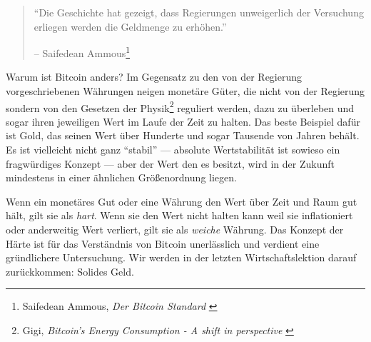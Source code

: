 \begin{quotation}\begin{samepage}
\enquote{Die Geschichte hat gezeigt, dass Regierungen unweigerlich der
Versuchung erliegen werden die Geldmenge zu erhöhen.}
\begin{flushright} -- Saifedean Ammous\footnote{Saifedean Ammous, \textit{Der
Bitcoin Standard} \cite{bitcoin-standard}}
\end{flushright}\end{samepage}\end{quotation}

Warum ist Bitcoin anders? Im Gegensatz zu den von der Regierung vorgeschriebenen
Währungen neigen monetäre Güter, die nicht von der Regierung sondern von den
Gesetzen der Physik\footnote{Gigi, \textit{Bitcoin's Energy Consumption - A
shift in perspective} \cite{gigi:energy}} reguliert werden, dazu zu überleben
und sogar ihren jeweiligen Wert im Laufe der Zeit zu halten. Das beste Beispiel
dafür ist Gold, das seinen Wert über Hunderte und sogar Tausende von Jahren
behält. Es ist vielleicht nicht ganz \enquote{stabil} --- absolute
Wertstabilität ist sowieso ein fragwürdiges Konzept --- aber der Wert den es
besitzt, wird in der Zukunft mindestens in einer ähnlichen Größenordnung liegen.



Wenn ein monetäres Gut oder eine Währung den Wert über Zeit und Raum gut hält,
gilt sie als \textit{hart}. Wenn sie den Wert nicht halten kann weil sie
inflationiert oder anderweitig Wert verliert, gilt sie als \textit{weiche}
Währung. Das Konzept der Härte ist für das Verständnis von Bitcoin unerlässlich
und verdient eine gründlichere Untersuchung. Wir werden in der letzten
Wirtschaftslektion darauf zurückkommen: Solides Geld.


